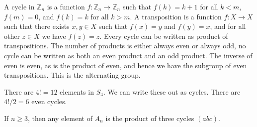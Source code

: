 \documentclass{book}                                                           %
\begin{document}
            A cycle in $\mathbb{Z}_{n}$ is a function
            $f:\mathbb{Z}_{n}\rightarrow\mathbb{Z}_{n}$ such that
            $f(k)=k+1$ for all $k<m$, $f(m)=0$, and $f(k)=k$ for all $k>m$.
            A transposition is a function $f:X\rightarrow{X}$ such that
            there exists $x,y\in{X}$ such that $f(x)=y$ and $f(y)=x$, and
            for all other $z\in{X}$ we have $f(z)=z$. Every cycle can be
            written as product of transpositions. The number of products is
            either always even or always odd, no cycle can be written as
            both an even product and an odd product. The inverse of even is
            even, as is the product of even, and hence we have the subgroup
            of even transpositions. This is the alternating group.
            \begin{example}
                There are $4!=12$ elements in $S_{4}$. We can write these
                out as cycles. There are $4!/2=6$ even cycles.
            \end{example}
            \begin{theorem}
                If $n\geq{3}$, then any element of $A_{n}$ is the product of
                three cycles $(abc)$.
            \end{theorem}
\end{document}
